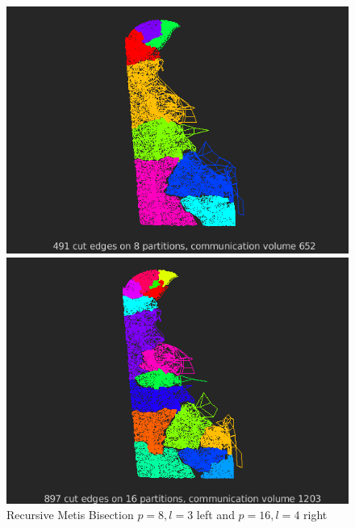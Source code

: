 \documentclass[unicode,11pt,a4paper,oneside,numbers=endperiod,openany]{scrartcl}
\begin{document}
 \begin{figure}[h!]
  \begin{minipage}[c]{0.46\linewidth}
        \centering
        \includegraphics[width=0.8\linewidth]{./img/figure3.png}
    \end{minipage}
    \hfill%
    \begin{minipage}[c]{0.46\linewidth}
        \centering
        \includegraphics[width=0.8\linewidth]{./img/figure4.png}
    \end{minipage}
  \caption{Recursive Metis Bisection ${p = 8, l = 3}$ left and ${ p = 16, l = 4}$ right}
  \label{fig:Another tiny Web}
\end{figure}
\end{document}

